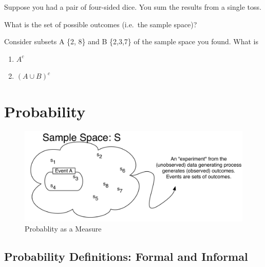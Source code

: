 \documentclass[
]{book}
\begin{document}
\begin{exercise}[Sets]
\protect\hypertarget{exr:sets1}{}\label{exr:sets1}

Suppose you had a pair of four-sided dice. You sum the results from a single toss.

What is the set of possible outcomes (i.e.~the sample space)?

Consider subsets A \{2, 8\} and B \{2,3,7\} of the sample space you found. What is

\begin{enumerate}
\def\labelenumi{\arabic{enumi}.}
\tightlist
\item
  \(A^c\)
\item
  \((A \cup B)^c\)
\end{enumerate}

\end{exercise}

\hypertarget{probdef}{%
\section{Probability}\label{probdef}}

\begin{figure}
\centering
\includegraphics{figure-latex/probability.png}
\caption[\label{fig:prob-image}Probablity as a Measure]{\label{fig:prob-image}Probablity as a Measure\footnotemark{}}
\end{figure}

\hypertarget{probability-definitions-formal-and-informal}{%
\subsection*{Probability Definitions: Formal and Informal}\label{probability-definitions-formal-and-informal}}
\end{document}
